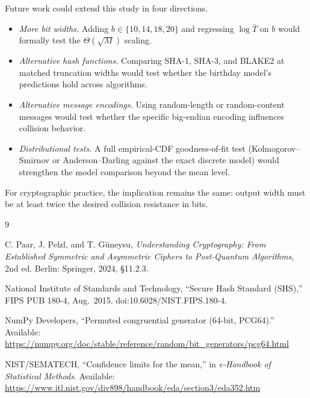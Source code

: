 \documentclass[12pt,letterpaper]{article}
\begin{document}
Future work could extend this study in four directions.
\begin{itemize}
    \item \emph{More bit widths.} Adding $b \in \{10, 14, 18, 20\}$ and regressing $\log \bar{T}$ on $b$ would formally test the $\Theta(\sqrt{M})$ scaling.
    \item \emph{Alternative hash functions.} Comparing SHA-1, SHA-3, and BLAKE2 at matched truncation widths would test whether the birthday model's predictions hold across algorithms.
    \item \emph{Alternative message encodings.} Using random-length or random-content messages would test whether the specific big-endian encoding influences collision behavior.
    \item \emph{Distributional tests.} A full empirical-CDF goodness-of-fit test (Kolmogorov--Smirnov or Anderson--Darling against the exact discrete model) would strengthen the model comparison beyond the mean level.
\end{itemize}

For cryptographic practice, the implication remains the same: output width must be at least twice the desired collision resistance in bits.

\begin{thebibliography}{9}

C. Paar, J. Pelzl, and T. G\"uneysu, \emph{Understanding Cryptography: From Established Symmetric and Asymmetric Ciphers to Post-Quantum Algorithms}, 2nd ed. Berlin: Springer, 2024, \S11.2.3.

National Institute of Standards and Technology, ``Secure Hash Standard (SHS),'' FIPS PUB 180-4, Aug.~2015. doi:10.6028/NIST.FIPS.180-4.

NumPy Developers, ``Permuted congruential generator (64-bit, PCG64).'' Available: \url{https://numpy.org/doc/stable/reference/random/bit_generators/pcg64.html}

NIST/SEMATECH, ``Confidence limits for the mean,'' in \emph{e-Handbook of Statistical Methods}. Available: \url{https://www.itl.nist.gov/div898/handbook/eda/section3/eda352.htm}

\end{thebibliography}
\end{document}
